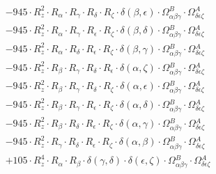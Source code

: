 \documentclass{article}
\begin{document}
\begin{equation}
\begin{array}{c}
 \\[0.2em] 		 - 945 \cdot R_{z}^{2} \cdot R_{\alpha{}} \cdot R_{\gamma{}} \cdot R_{\delta{}} \cdot R_{\zeta{}} \cdot \delta{}\left(\beta{}, \epsilon{}\right) \cdot \Omega{}^{B}_{\alpha{}\beta{}\gamma{}} \cdot \Omega{}^{A}_{\delta{}\epsilon{}\zeta{}} 
 \\[0.2em] 		 - 945 \cdot R_{z}^{2} \cdot R_{\alpha{}} \cdot R_{\gamma{}} \cdot R_{\epsilon{}} \cdot R_{\zeta{}} \cdot \delta{}\left(\beta{}, \delta{}\right) \cdot \Omega{}^{B}_{\alpha{}\beta{}\gamma{}} \cdot \Omega{}^{A}_{\delta{}\epsilon{}\zeta{}} 
 \\[0.2em] 		 - 945 \cdot R_{z}^{2} \cdot R_{\alpha{}} \cdot R_{\delta{}} \cdot R_{\epsilon{}} \cdot R_{\zeta{}} \cdot \delta{}\left(\beta{}, \gamma{}\right) \cdot \Omega{}^{B}_{\alpha{}\beta{}\gamma{}} \cdot \Omega{}^{A}_{\delta{}\epsilon{}\zeta{}} 
 \\[0.2em] 		 - 945 \cdot R_{z}^{2} \cdot R_{\beta{}} \cdot R_{\gamma{}} \cdot R_{\delta{}} \cdot R_{\epsilon{}} \cdot \delta{}\left(\alpha{}, \zeta{}\right) \cdot \Omega{}^{B}_{\alpha{}\beta{}\gamma{}} \cdot \Omega{}^{A}_{\delta{}\epsilon{}\zeta{}} 
 \\[0.2em] 		 - 945 \cdot R_{z}^{2} \cdot R_{\beta{}} \cdot R_{\gamma{}} \cdot R_{\delta{}} \cdot R_{\zeta{}} \cdot \delta{}\left(\alpha{}, \epsilon{}\right) \cdot \Omega{}^{B}_{\alpha{}\beta{}\gamma{}} \cdot \Omega{}^{A}_{\delta{}\epsilon{}\zeta{}} 
 \\[0.2em] 		 - 945 \cdot R_{z}^{2} \cdot R_{\beta{}} \cdot R_{\gamma{}} \cdot R_{\epsilon{}} \cdot R_{\zeta{}} \cdot \delta{}\left(\alpha{}, \delta{}\right) \cdot \Omega{}^{B}_{\alpha{}\beta{}\gamma{}} \cdot \Omega{}^{A}_{\delta{}\epsilon{}\zeta{}} 
 \\[0.2em] 		 - 945 \cdot R_{z}^{2} \cdot R_{\beta{}} \cdot R_{\delta{}} \cdot R_{\epsilon{}} \cdot R_{\zeta{}} \cdot \delta{}\left(\alpha{}, \gamma{}\right) \cdot \Omega{}^{B}_{\alpha{}\beta{}\gamma{}} \cdot \Omega{}^{A}_{\delta{}\epsilon{}\zeta{}} 
 \\[0.2em] 		 - 945 \cdot R_{z}^{2} \cdot R_{\gamma{}} \cdot R_{\delta{}} \cdot R_{\epsilon{}} \cdot R_{\zeta{}} \cdot \delta{}\left(\alpha{}, \beta{}\right) \cdot \Omega{}^{B}_{\alpha{}\beta{}\gamma{}} \cdot \Omega{}^{A}_{\delta{}\epsilon{}\zeta{}} 
 \\[0.2em] 		 + 105 \cdot R_{z}^{4} \cdot R_{\alpha{}} \cdot R_{\beta{}} \cdot \delta{}\left(\gamma{}, \delta{}\right) \cdot \delta{}\left(\epsilon{}, \zeta{}\right) \cdot \Omega{}^{B}_{\alpha{}\beta{}\gamma{}} \cdot \Omega{}^{A}_{\delta{}\epsilon{}\zeta{}} 

\end{array}
\end{equation}
\end{document}
